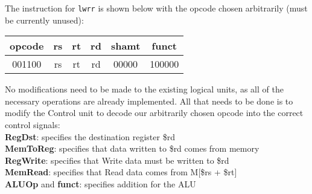 \documentclass[10pt,letterpaper]{article}
\begin{document}
The instruction for \texttt{lwrr} is shown below with the opcode chosen arbitrarily (must be currently unused):
\begin{center}
\begin{tabular} { |c|c|c|c|c|c| }
\hline
\textbf{opcode} & \textbf{rs} & \textbf{rt} & \textbf{rd} & \textbf{shamt} & \textbf{funct} \\
\hline
001100 & rs & rt & rd & 00000 & 100000 \\
\hline
\end{tabular}
\end{center}
No modifications need to be made to the existing logical units, as all of the necessary operations are already implemented. All that needs to be done is to modify the Control unit to decode our arbitrarily chosen opcode into the correct control signals:\\
\textbf{RegDst}: specifies the destination register \$rd\\
\textbf{MemToReg}: specifies that data written to \$rd comes from memory\\
\textbf{RegWrite}: specifies that Write data must be written to \$rd\\
\textbf{MemRead}: specifies that Read data comes from M[\$rs + \$rt]\\
\textbf{ALUOp} and \textbf{funct}: specifies addition for the ALU\\
\pagebreak

\end{document}
